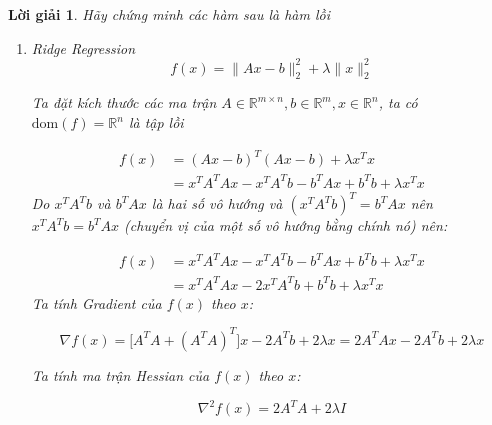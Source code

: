 \documentclass[14pt, a4paper]{article}
\theoremstyle{sltheorem}
\theoremstyle{soltheorem}
\newtheorem*{loigiai}{Lời giải}
\begin{document}
    \begin{loigiai}

        Hãy chứng minh các hàm sau là hàm lồi
        \begin{enumerate} [wide, labelwidth=!, labelindent=0pt,label=\textbf{\arabic*}.]
            \item Ridge Regression
            \begin{equation*}
                f(x)=\lVert Ax - b \rVert_2^2 + \lambda \lVert x \rVert_2^2
            \end{equation*}

            Ta đặt kích thước các ma trận $A \in \mathbb{R}^{m \times n}, b \in \mathbb{R}^{m}, x \in \mathbb{R}^{n}$, ta có $\mathrm{dom}(f)=\mathbb{R}^{n}$ là tập lồi

            \begin{equation*}
                \begin{aligned}
                    f(x) &= (Ax - b)^T (Ax - b) + \lambda x^T x \\
                    &=x^T A^T A x - x^TA^Tb - b^T Ax + b^T b + \lambda x^T x
                \end{aligned}
            \end{equation*}
            Do $x^TA^Tb$ và $b^TAx$ là hai số vô hướng và $(x^TA^Tb)^T=b^TAx$ nên $x^TA^Tb=b^TAx$ (chuyển vị của một số vô hướng bằng chính nó) nên:

            \begin{equation*}
                \begin{aligned}
                    f(x) &= x^T A^T A x - x^TA^Tb - b^T Ax + b^T b + \lambda x^T x\\
                    &=x^T A^T A x-2x^TA^Tb+b^Tb + \lambda x^T x
                \end{aligned}
            \end{equation*}
            Ta tính Gradient của $f(x)$ theo $x$:

            \begin{equation*}
                \nabla f(x) =\Big\lbrack A^TA + (A^TA)^T \Big\rbrack x - 2A^Tb + 2\lambda x = 2A^T A x - 2 A^T b + 2\lambda x
            \end{equation*}

            Ta tính ma trận Hessian của $f(x)$ theo $x$:

            \begin{equation*}
                \nabla^2 f(x) = 2A^T A + 2 \lambda I
            \end{equation*}


\end{enumerate}
\end{loigiai}
\end{document}
